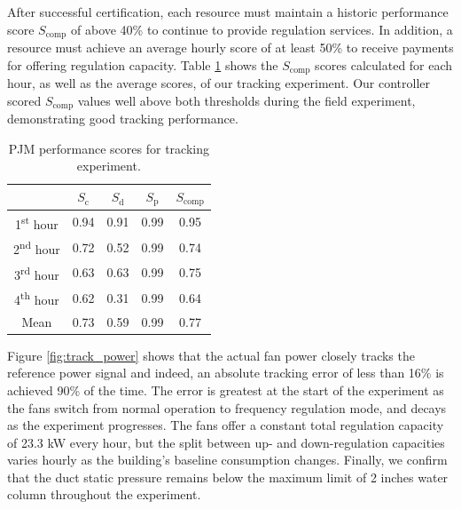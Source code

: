 After successful certification, each resource must maintain a historic performance score $S_\text{comp}$ of above 40\% to continue to provide regulation services. In addition, a resource must achieve an average hourly score of at least 50\% to receive payments for offering regulation capacity. 
Table \ref{tab:tracking} shows the $S_\text{comp}$ scores calculated for each hour, as well as the average scores, of our tracking experiment.
Our controller scored $S_\text{comp}$ values well above both thresholds during the field experiment, demonstrating good tracking performance. 


\begin{table}[b]
\centering
\begin{tabular}{c | c c c | c}
\toprule
 & $S_\text{c}$ & $S_\text{d}$ & $S_\text{p}$ & $S_\text{comp}$  \\ \hline
1\textsuperscript{st} hour & 0.94 & 0.91 & 0.99 & 0.95\\
2\textsuperscript{nd} hour & 0.72 & 0.52 & 0.99 & 0.74 \\
3\textsuperscript{rd} hour & 0.63 & 0.63 & 0.99 & 0.75 \\
4\textsuperscript{th} hour & 0.62 & 0.31 & 0.99 & 0.64 \\ %
Mean & 0.73 & 0.59 & 0.99 & 0.77 \\
\bottomrule
\end{tabular}
\caption{PJM performance scores for tracking experiment.}
\label{tab:tracking}
\end{table}

Figure \ref{fig:track_power} shows that the actual fan power closely tracks the reference power signal and indeed, an absolute tracking error of less than 16\% is achieved 90\% of the time. The error is greatest at the start of the experiment as the fans switch from normal operation to frequency regulation mode, and decays as the experiment progresses.
The fans offer a constant total regulation capacity of 23.3 kW every hour, %
but the split between up- and down-regulation capacities varies hourly as the building's baseline consumption changes. 
Finally, we confirm that the duct static pressure remains below the maximum limit of 2 inches water column throughout the experiment.

